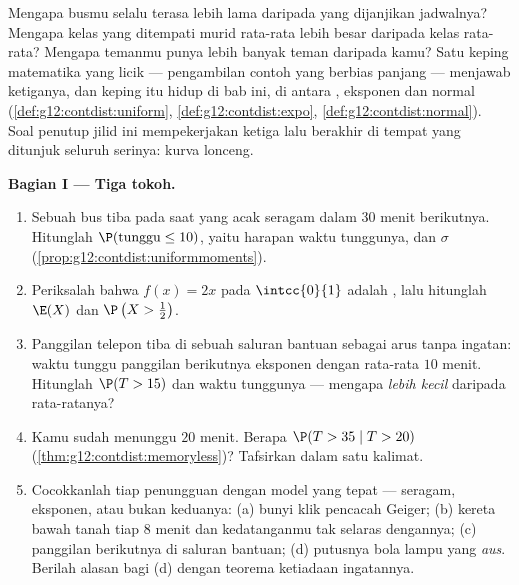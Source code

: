 \begin{problem}
\label{pb:g12:contdist:1}
Mengapa busmu selalu terasa lebih lama daripada yang dijanjikan jadwalnya?
Mengapa kelas yang ditempati murid rata-rata lebih besar
daripada kelas rata-rata? Mengapa temanmu punya lebih banyak teman
daripada kamu? Satu keping matematika yang licik --- pengambilan contoh
yang berbias panjang --- menjawab ketiganya, dan keping itu hidup di bab ini,
di antara , eksponen dan normal
(\cref{def:g12:contdist:uniform}, \cref{def:g12:contdist:expo},
\cref{def:g12:contdist:normal}). Soal penutup jilid
ini mempekerjakan ketiga  lalu berakhir di tempat yang ditunjuk seluruh
serinya: kurva lonceng.

\medskip
\noindent\textbf{Bagian I --- Tiga tokoh.}
\begin{enumerate}
  \item Sebuah bus tiba pada saat yang acak seragam dalam
        $30$ menit berikutnya. Hitunglah $\P(\text{tunggu} \leq 10)$, yaitu
        harapan waktu tunggunya, dan $\sigma$
        (\cref{prop:g12:contdist:uniformmoments}).
  \item Periksalah bahwa $f(x) = 2x$ pada $\intcc{0}{1}$ adalah ,
        lalu hitunglah $\E(X)$ dan $\P\left(X > \frac12\right)$.
  \item Panggilan telepon tiba di sebuah saluran bantuan sebagai arus tanpa ingatan:
        waktu tunggu panggilan berikutnya eksponen dengan rata-rata
        $10$ menit. Hitunglah $\P(T > 15)$ dan  waktu tunggunya
        --- mengapa  \emph{lebih kecil} daripada rata-ratanya?
  \item Kamu sudah menunggu $20$ menit. Berapa
        $\P(T > 35 \mid T > 20)$
        (\cref{thm:g12:contdist:memoryless})? Tafsirkan dalam satu
        kalimat.
  \item Cocokkanlah tiap penungguan dengan model yang tepat --- seragam,
        eksponen, atau bukan keduanya: (a) bunyi klik pencacah
        Geiger; (b) kereta bawah tanah tiap $8$ menit dan
        kedatanganmu tak selaras dengannya; (c) panggilan berikutnya di
        saluran bantuan; (d) putusnya bola lampu yang
        \emph{aus}. Berilah alasan bagi (d) dengan teorema
        ketiadaan ingatannya.
\end{enumerate}


\end{problem}
